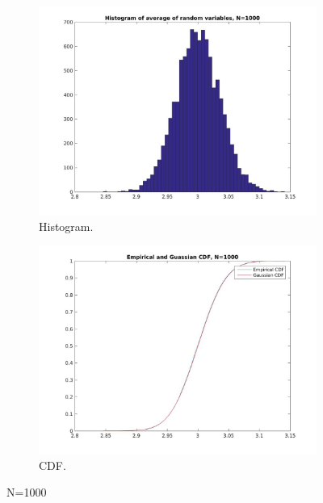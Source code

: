 \documentclass[12pt]{article}
\begin{document}
\begin{figure}[h!]
  \centering
  \begin{subfigure}[b]{0.4\linewidth}
    \includegraphics[width=\linewidth]{jpgs/histograms/1000_hist.jpg}
    \caption{Histogram.}
  \end{subfigure}
  \begin{subfigure}[b]{0.4\linewidth}
    \includegraphics[width=\linewidth]{jpgs/cdfs/1000_cdf.jpg}
    \caption{CDF.}
  \end{subfigure}
  \caption{N=1000}
\end{figure}
\end{document}
